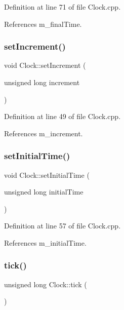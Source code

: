 Definition at line 71 of file Clock.\+cpp.



References m\+\_\+final\+Time.

\mbox{\label{class_clock_a1ae60dca4e41f6e27d6104ec618c02f1}} 
\subsubsection{set\+Increment()}
{\footnotesize\ttfamily void Clock\+::set\+Increment (\begin{DoxyParamCaption}\item[{unsigned long}]{increment }\end{DoxyParamCaption})}



Definition at line 49 of file Clock.\+cpp.



References m\+\_\+increment.

\mbox{\label{class_clock_abe7fb8f715d0dcae08e52b2b7aed7db2}} 
\subsubsection{set\+Initial\+Time()}
{\footnotesize\ttfamily void Clock\+::set\+Initial\+Time (\begin{DoxyParamCaption}\item[{unsigned long}]{initial\+Time }\end{DoxyParamCaption})}



Definition at line 57 of file Clock.\+cpp.



References m\+\_\+initial\+Time.

\mbox{\label{class_clock_ab7c857c5b43cf98d991435ba9ce46b2c}} 
\subsubsection{tick()}
{\footnotesize\ttfamily unsigned long Clock\+::tick (\begin{DoxyParamCaption}{ }\end{DoxyParamCaption})}



